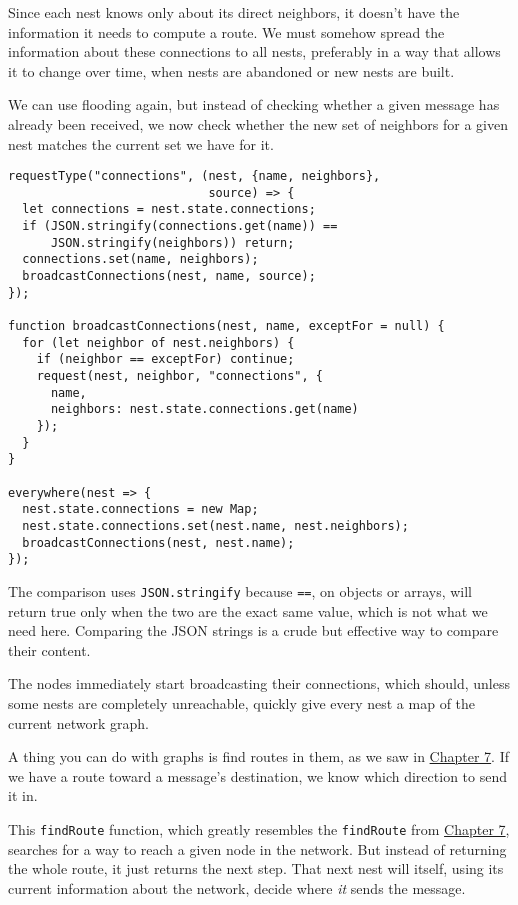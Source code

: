 Since each nest knows only about its direct neighbors, it doesn't have the information it needs to compute a route. We must somehow spread the information about these connections to all nests, preferably in a way that allows it to change over time, when nests are abandoned or new nests are built.

We can use flooding again, but instead of checking whether a given message has already been received, we now check whether the new set of neighbors for a given nest matches the current set we have for it.

\begin{lstlisting}
requestType("connections", (nest, {name, neighbors},
                            source) => {
  let connections = nest.state.connections;
  if (JSON.stringify(connections.get(name)) ==
      JSON.stringify(neighbors)) return;
  connections.set(name, neighbors);
  broadcastConnections(nest, name, source);
});

function broadcastConnections(nest, name, exceptFor = null) {
  for (let neighbor of nest.neighbors) {
    if (neighbor == exceptFor) continue;
    request(nest, neighbor, "connections", {
      name,
      neighbors: nest.state.connections.get(name)
    });
  }
}

everywhere(nest => {
  nest.state.connections = new Map;
  nest.state.connections.set(nest.name, nest.neighbors);
  broadcastConnections(nest, nest.name);
});
\end{lstlisting}
\noindent{}

The comparison uses \lstinline`JSON.stringify` because \lstinline`==`, on objects or arrays, will return true only when the two are the exact same value, which is not what we need here. Comparing the JSON strings is a crude but effective way to compare their content.

The nodes immediately start broadcasting their connections, which should, unless some nests are completely unreachable, quickly give every nest a map of the current network graph.

A thing you can do with graphs is find routes in them, as we saw in \hyperref[robot]{Chapter 7}. If we have a route toward a message's destination, we know which direction to send it in.

This \lstinline`findRoute` function, which greatly resembles the \lstinline`findRoute` from \hyperref[robot.findRoute]{Chapter 7}, searches for a way to reach a given node in the network. But instead of returning the whole route, it just returns the next step. That next nest will itself, using its current information about the network, decide where \emph{it} sends the message.


